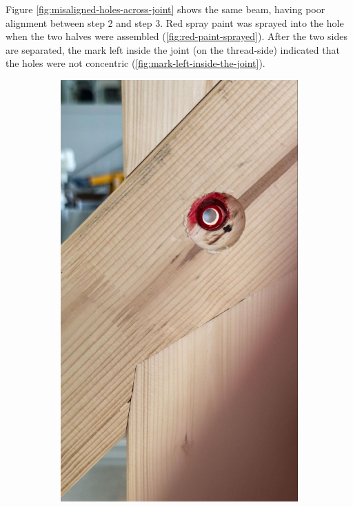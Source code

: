 Figure \ref{fig:misaligned-holes-across-joint} shows the same beam, having poor alignment between step 2 and step 3. Red spray paint was sprayed into the hole when the two halves were assembled (\ref{fig:red-paint-sprayed}). After the two sides are separated, the mark left inside the joint (on the thread-side) indicated that the holes were not concentric (\ref{fig:mark-left-inside-the-joint}).

\begin{figure}[!h]
    \centering
    \begin{subfigure}[b]{0.49\textwidth}
        \centering
        \includegraphics[width=\textwidth]{images/7b/img71.jpg}

\end{subfigure}
\end{figure}
